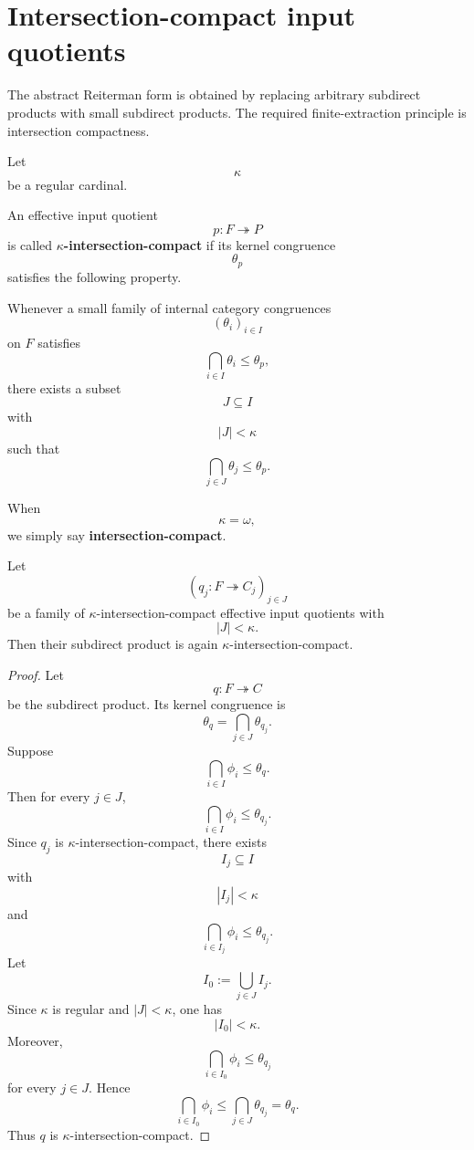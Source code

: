 \section{Intersection-compact input quotients}
\label{sec:eilenberg-intersection-compact-input-quotients}

The abstract Reiterman form is obtained by replacing arbitrary subdirect
products with small subdirect products. The required finite-extraction
principle is intersection compactness.

Let
\[
\kappa
\]
be a regular cardinal.

\begin{definition}
\label{def:eilenberg-kappa-intersection-compact-quotient}
An effective input quotient
\[
p:F\twoheadrightarrow P
\]
is called \textbf{\(\kappa\)-intersection-compact} if its kernel congruence
\[
\theta_p
\]
satisfies the following property.

Whenever a small family of internal category congruences
\[
(\theta_i)_{i\in I}
\]
on \(F\) satisfies
\[
\bigcap_{i\in I}\theta_i\leq\theta_p,
\]
there exists a subset
\[
J\subseteq I
\]
with
\[
|J|<\kappa
\]
such that
\[
\bigcap_{j\in J}\theta_j\leq\theta_p.
\]
\end{definition}

When
\[
\kappa=\omega,
\]
we simply say \textbf{intersection-compact}.

\begin{proposition}
\label{prop:eilenberg-small-subdirect-products-preserve-compactness}
Let
\[
(q_j:F\twoheadrightarrow C_j)_{j\in J}
\]
be a family of \(\kappa\)-intersection-compact effective input quotients with
\[
|J|<\kappa.
\]
Then their subdirect product is again \(\kappa\)-intersection-compact.
\end{proposition}

\begin{proof}
Let
\[
q:F\twoheadrightarrow C
\]
be the subdirect product. Its kernel congruence is
\[
\theta_q=\bigcap_{j\in J}\theta_{q_j}.
\]
Suppose
\[
\bigcap_{i\in I}\phi_i\leq\theta_q.
\]
Then for every \(j\in J\),
\[
\bigcap_{i\in I}\phi_i\leq\theta_{q_j}.
\]
Since \(q_j\) is \(\kappa\)-intersection-compact, there exists
\[
I_j\subseteq I
\]
with
\[
|I_j|<\kappa
\]
and
\[
\bigcap_{i\in I_j}\phi_i\leq\theta_{q_j}.
\]
Let
\[
I_0:=\bigcup_{j\in J}I_j.
\]
Since \(\kappa\) is regular and \(|J|<\kappa\), one has
\[
|I_0|<\kappa.
\]
Moreover,
\[
\bigcap_{i\in I_0}\phi_i
\leq
\theta_{q_j}
\]
for every \(j\in J\). Hence
\[
\bigcap_{i\in I_0}\phi_i
\leq
\bigcap_{j\in J}\theta_{q_j}
=
\theta_q.
\]
Thus \(q\) is \(\kappa\)-intersection-compact.
\end{proof}

